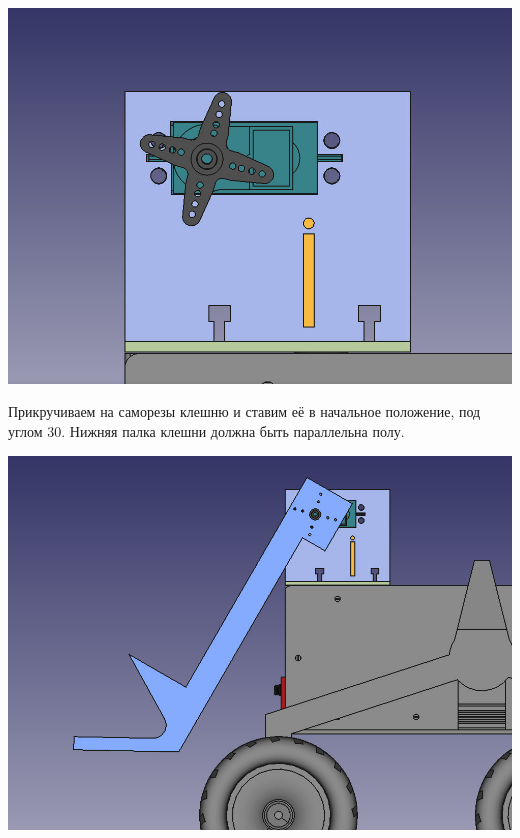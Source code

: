 \documentclass[12pt,a4paper,oneside]{article}
\begin{document}
\includegraphics[width=\textwidth]{servo.png}

Прикручиваем на саморезы клешню и ставим её в начальное положение, под углом 30.
Нижняя палка клешни должна быть  параллельна полу. 

\includegraphics[width=\textwidth]{full_claw.png}
\end{document}
